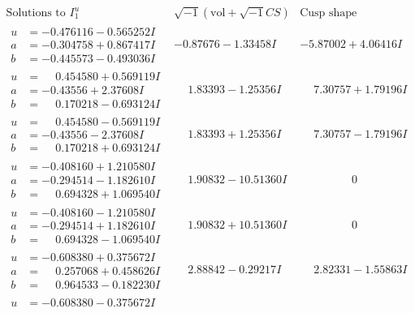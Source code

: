 \documentclass[1p]{elsarticle_modified}
\theoremstyle{definition}
\newcommand{\I}{\sqrt{-1}}
\begin{document}
$$\begin{array}{c|c|c}
\text{Solutions to }I^u_{1}& \I (\text{vol} + \sqrt{-1}CS) & \text{Cusp shape}\\
 \hline 
\begin{aligned}
u &= -0.476116 - 0.565252 I \\
a &= -0.304758 + 0.867417 I \\
b &= -0.445573 - 0.493036 I\end{aligned}
 & -0.87676 - 1.33458 I & -5.87002 + 4.06416 I \\ \hline\begin{aligned}
u &= \phantom{-}0.454580 + 0.569119 I \\
a &= -0.43556 + 2.37608 I \\
b &= \phantom{-}0.170218 - 0.693124 I\end{aligned}
 & \phantom{-}1.83393 - 1.25356 I & \phantom{-}7.30757 + 1.79196 I \\ \hline\begin{aligned}
u &= \phantom{-}0.454580 - 0.569119 I \\
a &= -0.43556 - 2.37608 I \\
b &= \phantom{-}0.170218 + 0.693124 I\end{aligned}
 & \phantom{-}1.83393 + 1.25356 I & \phantom{-}7.30757 - 1.79196 I \\ \hline\begin{aligned}
u &= -0.408160 + 1.210580 I \\
a &= -0.294514 - 1.182610 I \\
b &= \phantom{-}0.694328 + 1.069540 I\end{aligned}
 & \phantom{-}1.90832 - 10.51360 I & \phantom{-0.000000 } 0 \\ \hline\begin{aligned}
u &= -0.408160 - 1.210580 I \\
a &= -0.294514 + 1.182610 I \\
b &= \phantom{-}0.694328 - 1.069540 I\end{aligned}
 & \phantom{-}1.90832 + 10.51360 I & \phantom{-0.000000 } 0 \\ \hline\begin{aligned}
u &= -0.608380 + 0.375672 I \\
a &= \phantom{-}0.257068 + 0.458626 I \\
b &= \phantom{-}0.964533 - 0.182230 I\end{aligned}
 & \phantom{-}2.88842 - 0.29217 I & \phantom{-}2.82331 - 1.55863 I \\ \hline\begin{aligned}
u &= -0.608380 - 0.375672 I \\

\end{aligned}
\end{array}$$
\end{document}
